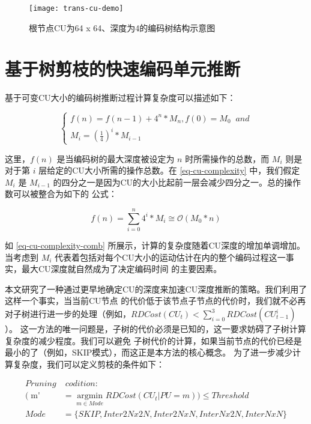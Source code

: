 \begin{figure}[H] %
  \centering
  \texttt{[image: trans-cu-demo]}
  \caption{根节点CU为64 x 64、深度为4的编码树结构示意图}
  \label{fig:trans-cu-demo}
\end{figure}


\section{基于树剪枝的快速编码单元推断}

基于可变CU大小的编码树推断过程计算复杂度可以描述如下：

\begin{equation}
\label{eq-cu-complexity}
\left\{\begin{array}{l}
f(n) = f(n - 1) + 4^n * M_n, f(0) = M_0 \;\; and \\
M_i = {(\frac14)}^i * M_{i - 1}
\end{array}\right.
\end{equation}

这里，$f(n)$ 是当编码树的最大深度被设定为 $n$ 时所需操作的总数，而 $M_i$ 则是
对于第 $i$ 层给定的CU大小所需的操作总数。在 \ref{eq-cu-complexity} 中，我们假定 $M_i$ 是
$M_{i-1}$ 的四分之一是因为CU的大小比起前一层会减少四分之一。总的操作数可以被整合为如下的
公式：

\begin{equation}
\label{eq-cu-complexity-comb}
f(n) = \sum_{i=0}^n 4^i * M_i \cong \mathcal{O} (M_0 * n)
\end{equation}

如 \ref{eq-cu-complexity-comb} 所展示，计算的复杂度随着CU深度的增加单调增加。当考虑到 $M_i$
代表着包括对每个CU大小的运动估计在内的整个编码过程这一事实，最大CU深度就自然成为了决定编码时间
的主要因素。

本文研究了一种通过更早地确定CU的深度来加速CU深度推断的策略。我们利用了这样一个事实，当当前CU节点
的代价低于该节点子节点的代价时，我们就不必再对子树进行进一步的处理（例如，$RDCost(CU_t) < \sum_{i=0}^3 RDCost(CU^i_{t-1})$）。
这一方法的唯一问题是，子树的代价必须是已知的，这一要求妨碍了子树计算复杂度的减少程度。我们可以避免
子树代价的计算，如果当前节点的代价已经是最小的了（例如，SKIP模式），而这正是本方法的核心概念。
为了进一步减少计算复杂度，我们可以定义剪枝的条件如下：

\begin{equation}
\label{eq-pruning-condition}
\begin{split}
Pruning & \; codition: \\
(\mathop{m'} & =  \mathop{argmin}\limits_{m \in Mode} RDCost(CU_t | PU=m)) \le Threshold \\
Mode & = \{ SKIP, Inter2Nx2N, Inter2NxN, InterNx2N, InterNxN \} 
\end{split}
\end{equation}


